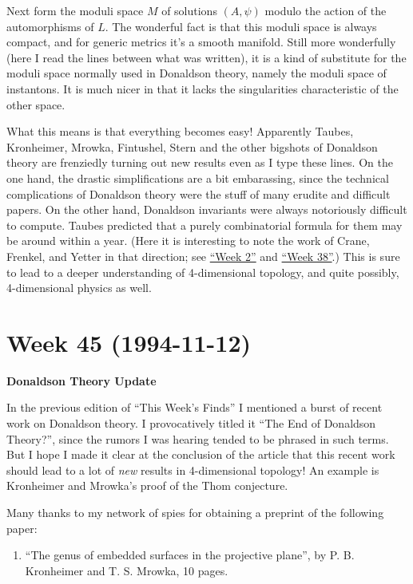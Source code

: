 \documentclass{article}
\def\tightlist{}
\begin{document}
Next form the moduli space \(M\) of solutions \((A, \psi)\) modulo the
action of the automorphisms of \(L\). The wonderful fact is that this
moduli space is always compact, and for generic metrics it's a smooth
manifold. Still more wonderfully (here I read the lines between what was
written), it is a kind of substitute for the moduli space normally used
in Donaldson theory, namely the moduli space of instantons. It is much
nicer in that it lacks the singularities characteristic of the other
space.

What this means is that everything becomes easy! Apparently Taubes,
Kronheimer, Mrowka, Fintushel, Stern and the other bigshots of Donaldson
theory are frenziedly turning out new results even as I type these
lines. On the one hand, the drastic simplifications are a bit
embarassing, since the technical complications of Donaldson theory were
the stuff of many erudite and difficult papers. On the other hand,
Donaldson invariants were always notoriously difficult to compute.
Taubes predicted that a purely combinatorial formula for them may be
around within a year. (Here it is interesting to note the work of Crane,
Frenkel, and Yetter in that direction; see
\protect\hyperlink{week2}{``Week 2''} and
\protect\hyperlink{week38}{``Week 38''}.) This is sure to lead to a
deeper understanding of 4-dimensional topology, and quite possibly,
4-dimensional physics as well.
\hypertarget{week45}{%
\section{Week 45 (1994-11-12)}\label{week45}}

\textbf{Donaldson Theory Update}

In the previous edition of ``This Week's Finds'' I mentioned a burst of
recent work on Donaldson theory. I provocatively titled it ``The End of
Donaldson Theory?'', since the rumors I was hearing tended to be phrased
in such terms. But I hope I made it clear at the conclusion of the
article that this recent work should lead to a lot of \emph{new} results
in 4-dimensional topology! An example is Kronheimer and Mrowka's proof
of the Thom conjecture.

Many thanks to my network of spies for obtaining a preprint of the
following paper:

\begin{enumerate}
\def\labelenumi{\arabic{enumi})}
\tightlist
\item
  ``The genus of embedded surfaces in the projective plane'', by P. B.
  Kronheimer and T. S. Mrowka, 10 pages.
\end{enumerate}
\end{document}
